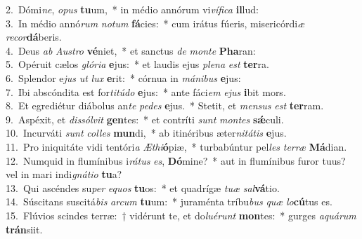 {2.~}Dómi\textit{ne}, \textit{o}\textit{pus} \textbf{tu}um,~* in médio annórum vi\textit{ví}\textit{fi}\textit{ca} \textbf{il}lud:\\
{3.~}In médio annó\textit{rum} \textit{no}\textit{tum} \textbf{fá}cies:~* cum irátus fúeris, misericórdi\textit{æ} \textit{re}\textit{cor}\textbf{dá}beris.\\
{4.~}Deus \textit{ab} \textit{Au}\textit{stro} \textbf{vé}niet,~* et sanctus \textit{de} \textit{mon}\textit{te} \textbf{Pha}ran:\\
{5.~}Opéruit cælos \textit{gló}\textit{ri}\textit{a} \textbf{e}jus:~* et laudis ejus \textit{ple}\textit{na} \textit{est} \textbf{ter}ra.\\
{6.~}Splendor e\textit{jus} \textit{ut} \textit{lux} \textbf{e}rit:~* córnua in \textit{má}\textit{ni}\textit{bus} \textbf{e}jus:\\
{7.~}Ibi abscóndita est for\textit{ti}\textit{tú}\textit{do} \textbf{e}jus:~* ante fáci\textit{em} \textit{e}\textit{jus} \textbf{i}bit mors.\\
{8.~}Et egrediétur diábolus an\textit{te} \textit{pe}\textit{des} \textbf{e}jus.~* Stetit, et \textit{men}\textit{sus} \textit{est} \textbf{ter}ram.\\
{9.~}Aspéxit, et \textit{dis}\textit{sól}\textit{vit} \textbf{gen}tes:~* et contríti \textit{sunt} \textit{mon}\textit{tes} \textbf{sǽ}culi.\\
{10.~}Incurváti \textit{sunt} \textit{col}\textit{les} \textbf{mun}di,~* ab itinéribus æter\textit{ni}\textit{tá}\textit{tis} \textbf{e}jus.\\
{11.~}Pro iniquitáte vidi tentóri\textit{a} \textit{Æ}\textit{thi}\textbf{ó}piæ,~* turbabúntur pel\textit{les} \textit{ter}\textit{ræ} \textbf{Má}dian.\\
{12.~}Numquid in flumínibus i\textit{rá}\textit{tus} \textit{es}, \textbf{Dó}mine?~* aut in flumínibus furor tuus? vel in mari indi\textit{gná}\textit{ti}\textit{o} \textbf{tu}a?\\
{13.~}Qui ascéndes su\textit{per} \textit{e}\textit{quos} \textbf{tu}os:~* et quadrígæ \textit{tu}\textit{æ} \textit{sal}\textbf{vá}tio.\\
{14.~}Súscitans suscitá\textit{bis} \textit{ar}\textit{cum} \textbf{tu}um:~* juraménta tríbu\textit{bus} \textit{quæ} \textit{lo}\textbf{cú}tus es.\\
{15.~}Flúvios scindes terræ:~† vidérunt te, et do\textit{lu}\textit{é}\textit{runt} \textbf{mon}tes:~* gurges \textit{a}\textit{quá}\textit{rum} \textbf{trán}siit.\\
